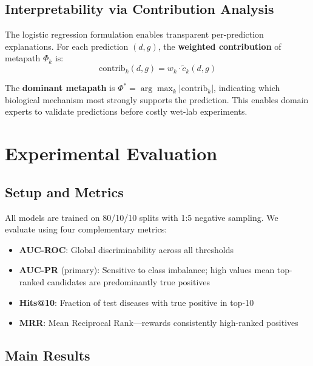 \documentclass{article}
\begin{document}
\subsection{Interpretability via Contribution Analysis}
\label{sec:interp_method}

The logistic regression formulation enables transparent per-prediction explanations. For each prediction $(d,g)$, the \textbf{weighted contribution} of metapath $\Phi_k$ is:
\begin{equation}
\text{contrib}_k(d,g) = w_k \cdot \tilde{c}_k(d,g)
\label{eq:contribution}
\end{equation}

The \textbf{dominant metapath} is $\Phi^* = \arg\max_k |\text{contrib}_k|$, indicating which biological mechanism most strongly supports the prediction. This enables domain experts to validate predictions before costly wet-lab experiments.

\section{Experimental Evaluation}
\label{sec:eval}

\subsection{Setup and Metrics}

All models are trained on 80/10/10 splits with 1:5 negative sampling. We evaluate using four complementary metrics:

\begin{itemize}
\item \textbf{AUC-ROC}: Global discriminability across all thresholds
\item \textbf{AUC-PR} (primary): Sensitive to class imbalance; high values mean top-ranked candidates are predominantly true positives
\item \textbf{Hits@10}: Fraction of test diseases with true positive in top-10
\item \textbf{MRR}: Mean Reciprocal Rank---rewards consistently high-ranked positives
\end{itemize}

\subsection{Main Results}
\end{document}
